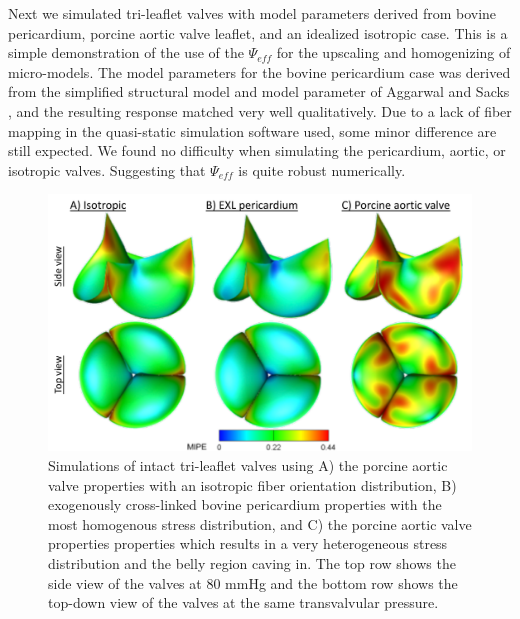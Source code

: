 	Next we simulated tri-leaflet valves with model parameters derived from bovine pericardium, porcine aortic valve leaflet, and an idealized isotropic case. This is a simple demonstration of the use of the $\Psi_{eff}$ for the upscaling and homogenizing of micro-models. The model parameters for the bovine pericardium case was derived from the simplified structural model and model parameter of Aggarwal and Sacks \cite{aggarwal_inverse_2015}, and the resulting response matched very well qualitatively. Due to a lack of fiber mapping in the quasi-static simulation software used, some minor difference are still expected. We found no difficulty when simulating the pericardium, aortic, or isotropic valves. Suggesting that $\Psi_{eff}$ is quite robust numerically. 

\begin{figure}
\centering
\includegraphics[width=6.5in]{Figures/valvesimulations}
\caption{Simulations of intact tri-leaflet valves using A) the porcine aortic valve properties with an isotropic fiber orientation distribution, B) exogenously cross-linked bovine pericardium properties with the most homogenous stress distribution, and C) the porcine aortic valve properties properties which results in a very heterogeneous stress distribution and the belly region caving in. The top row shows the side view of the valves at 80 mmHg and the bottom row shows the top-down view of the valves at the same transvalvular pressure.}
\label{fig:valvesimulations}
\end{figure}
    
